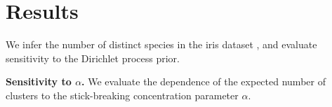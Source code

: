 \documentclass[a0,plainsections,30pt]{sciposter}\usepackage[]{graphicx}\usepackage[]{color}
\newenvironment{knitrout}{}{} %
\newcommand{\Expect}{\mathbb{E}}
\newcommand{\etazopt}{\eta_z^{*}}
\newcommand{\etathetaopt}{\eta_\theta^{*}}
\newcommand{\QExpect}
{\Expect_{q\left(\theta, z \vert \eta_\theta, \etazopt(\eta_\theta)\right)}}
\begin{document}
\begin{minipage}[t]{0.45\textwidth}

\end{minipage}
\hfill \vrule \hfill
\begin{minipage}[t]{0.45\textwidth}




\section*{Results}
\vspace{-0.3in}
We infer the number of distinct species in the iris
dataset \cite{iris_data_anderson}, and evaluate sensitivity to the Dirichlet process prior.  
\vspace{0.1in}

{\bf \large Sensitivity to $\alpha$.}
We evaluate the dependence of the expected number of clusters to the stick-breaking concentration parameter $\alpha$. 

\vspace{0.05in}




\begin{figure}
\centering
\begin{knitrout}
\color{fgcolor}


\end{knitrout}
\end{figure}
\end{minipage}
\end{document}

